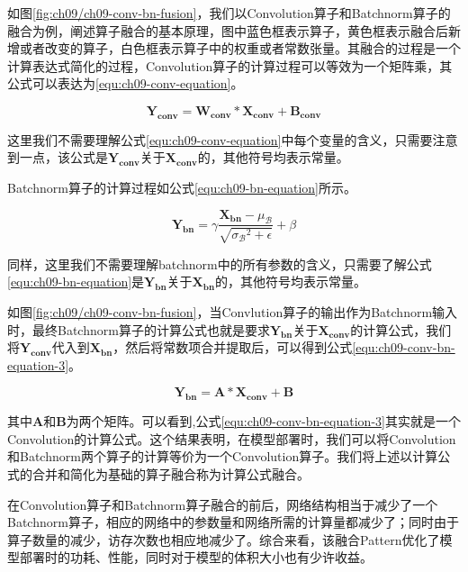 如图\ref{fig:ch09/ch09-conv-bn-fusion}，我们以Convolution算子和Batchnorm算子的融合为例，阐述算子融合的基本原理，图中蓝色框表示算子，黄色框表示融合后新增或者改变的算子，白色框表示算子中的权重或者常数张量。其融合的过程是一个计算表达式简化的过程，Convolution算子的计算过程可以等效为一个矩阵乘，其公式可以表达为\ref{equ:ch09-conv-equation}。

\begin{equation}\label{equ:ch09-conv-equation}
\bm{Y_{conv}}=\bm{W_{conv}}*\bm{X_{conv}}+\bm{B_{conv}}
\end{equation}

这里我们不需要理解公式\ref{equ:ch09-conv-equation}中每个变量的含义，只需要注意到一点，该公式是$\bm{Y_{conv}}$关于$\bm{X_{conv}}$的，其他符号均表示常量。

Batchnorm算子的计算过程如公式\ref{equ:ch09-bn-equation}所示。

\begin{equation}\label{equ:ch09-bn-equation}
\bm{Y_{bn}}=\gamma\frac{\bm{X_{bn}}-\mu_{\mathcal{B}}}{\sqrt{{\sigma_{\mathcal{B}}}^{2}+\epsilon}}+\beta
\end{equation}

同样，这里我们不需要理解batchnorm中的所有参数的含义，只需要了解公式\ref{equ:ch09-bn-equation}是$\bm{Y_{bn}}$关于$\bm{X_{bn}}$的，其他符号均表示常量。

如图\ref{fig:ch09/ch09-conv-bn-fusion}，当Convlution算子的输出作为Batchnorm输入时，最终Batchnorm算子的计算公式也就是要求$\bm{Y_{bn}}$关于$\bm{X_{conv}}$的计算公式，我们将$\bm{Y_{conv}}$代入到$\bm{X_{bn}}$，然后将常数项合并提取后，可以得到公式\ref{equ:ch09-conv-bn-equation-3}。

\begin{equation}\label{equ:ch09-conv-bn-equation-3}
\bm{Y_{bn}}=\bm{A}*\bm{X_{conv}}+\bm{B}
\end{equation}

其中$\bm{A}$和$\bm{B}$为两个矩阵。可以看到,公式\ref{equ:ch09-conv-bn-equation-3}其实就是一个Convolution的计算公式。这个结果表明，在模型部署时，我们可以将Convolution和Batchnorm两个算子的计算等价为一个Convolution算子。我们将上述以计算公式的合并和简化为基础的算子融合称为计算公式融合。

在Convolution算子和Batchnorm算子融合的前后，网络结构相当于减少了一个Batchnorm算子，相应的网络中的参数量和网络所需的计算量都减少了；同时由于算子数量的减少，访存次数也相应地减少了。综合来看，该融合Pattern优化了模型部署时的功耗、性能，同时对于模型的体积大小也有少许收益。
    
